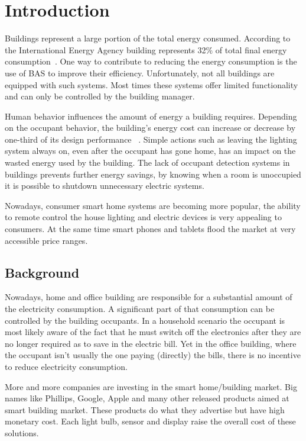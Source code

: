 \chapter{Introduction}
\label{chapter:introduction}
Buildings represent a large portion of the total energy consumed. According to the International Energy Agency building represents 32\% of total final energy consumption~\cite{iea}. One way to contribute to reducing the energy consumption is the use of \ac{BAS} to improve their efficiency. Unfortunately, not all buildings are equipped with such systems. Most times these systems offer limited functionality and can only be controlled by the building manager.

Human behavior influences the amount of energy a building requires. Depending on the occupant behavior, the building's energy cost can increase or decrease by one-third of its design performance ~\cite{ocupancy2}. Simple actions such as leaving the lighting system always on, even after the occupant has gone home, has an impact on the wasted energy used by the building. The lack of occupant detection systems in buildings prevents further energy savings, by knowing when a room is unoccupied it is possible to shutdown unnecessary electric systems.

Nowadays, consumer smart home systems are becoming more popular, the ability to remote control the house lighting and electric devices is very appealing to consumers. At the same time smart phones and tablets flood the market at very accessible price ranges. 

\section{Background}
\label{section:background}
Nowadays, home and office building are responsible for a substantial amount of the electricity consumption. A significant part of that consumption can be controlled by the building occupants. In a household scenario the occupant is most likely aware of the fact that he must switch off the electronics after they are no longer required as to save in the electric bill. Yet in the office building, where the occupant isn't usually the one paying (directly) the bills, there is no incentive to reduce electricity consumption.

More and more companies are investing in the smart home/building market. Big names like Phillips, Google, Apple and many other released products aimed at smart building market. These products do what they advertise but have high monetary cost. Each light bulb, sensor and display raise the overall cost of these solutions.


